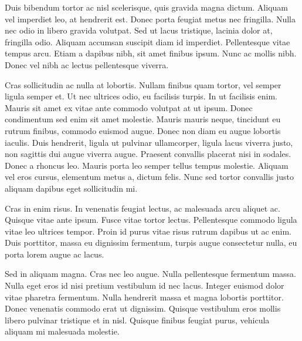 \documentclass{book}
\begin{document}
Duis bibendum tortor ac nisl scelerisque, quis gravida magna dictum. Aliquam vel
imperdiet leo, at hendrerit est. Donec porta feugiat metus nec fringilla. Nulla
nec odio in libero gravida volutpat. Sed ut lacus tristique, lacinia dolor at,
fringilla odio. Aliquam accumsan suscipit diam id imperdiet. Pellentesque vitae
tempus arcu. Etiam a dapibus nibh, sit amet finibus ipsum. Nunc ac mollis
nibh. Donec vel nibh ac lectus pellentesque viverra.

Cras sollicitudin ac nulla at lobortis. Nullam finibus quam tortor, vel semper
ligula semper et. Ut nec ultrices odio, eu facilisis turpis. In ut facilisis
enim. Mauris sit amet ex vitae ante commodo volutpat at ut ipsum. Donec
condimentum sed enim sit amet molestie. Mauris mauris neque, tincidunt eu rutrum
finibus, commodo euismod augue. Donec non diam eu augue lobortis iaculis. Duis
hendrerit, ligula ut pulvinar ullamcorper, ligula lacus viverra justo, non
sagittis dui augue viverra augue. Praesent convallis placerat nisi in
sodales. Donec a rhoncus leo. Mauris porta leo semper tellus tempus
molestie. Aliquam vel eros cursus, elementum metus a, dictum felis. Nunc sed
tortor convallis justo aliquam dapibus eget sollicitudin mi.

Cras in enim risus. In venenatis feugiat lectus, ac malesuada arcu aliquet
ac. Quisque vitae ante ipsum. Fusce vitae tortor lectus. Pellentesque commodo
ligula vitae leo ultrices tempor. Proin id purus vitae risus rutrum dapibus ut
ac enim. Duis porttitor, massa eu dignissim fermentum, turpis augue consectetur
nulla, eu porta lorem augue ac lacus.

Sed in aliquam magna. Cras nec leo augue. Nulla pellentesque fermentum
massa. Nulla eget eros id nisi pretium vestibulum id nec lacus. Integer euismod
dolor vitae pharetra fermentum. Nulla hendrerit massa et magna lobortis
porttitor. Donec venenatis commodo erat ut dignissim. Quisque vestibulum eros
mollis libero pulvinar tristique et in nisl. Quisque finibus feugiat purus,
vehicula aliquam mi malesuada molestie.



\end{document}
